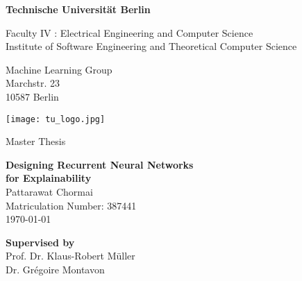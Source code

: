 \thispagestyle{empty}
\begin{center}

{\LARGE \textbf{Technische Universit\"at Berlin}}

\vspace{0.5cm}

{\large Faculty IV : Electrical Engineering and Computer Science
\\[1mm]}
{\large Institute of Software Engineering and Theoretical Computer Science\\[5mm]}

Machine Learning Group\\
Marchstr. 23\\
10587 Berlin\\

\vspace*{1cm}

\texttt{[image: tu\_logo.jpg]}

\vspace*{1.0cm}

{\LARGE{Master Thesis} }

\vspace{1.0cm}
{\LARGE \textbf{Designing Recurrent Neural Networks}}\\
\vspace*{0.3cm}
{\LARGE \textbf{ for Explainability}}\\
\vspace*{1.0cm}
{\LARGE Pattarawat Chormai}
\\
\vspace*{0.5cm}
Matriculation Number: 387441\\
\today  \\ %

\vspace*{1.0cm}

\textbf{Supervised by}\\
Prof. Dr. Klaus-Robert M\"{u}ller \\
Dr. Gr\'{e}goire Montavon


\vspace{3cm}


\end{center}

